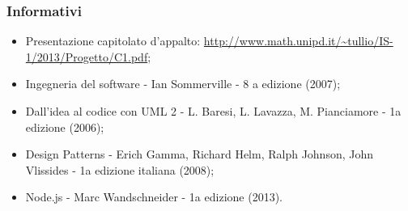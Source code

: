 		\subsubsection{Informativi}

		\begin{itemize}
		\item Presentazione capitolato d'appalto: \url{http://www.math.unipd.it/~tullio/IS-1/2013/Progetto/C1.pdf};
		\item Ingegneria del software - Ian Sommerville - 8 a edizione (2007);
		\item Dall’idea al codice con UML 2 - L. Baresi, L. Lavazza, M. Pianciamore - 1a edizione
(2006);
		\item Design Patterns - Erich Gamma, Richard Helm, Ralph Johnson, John Vlissides - 1a edizione italiana (2008);
		\item Node.js - Marc Wandschneider - 1a edizione (2013).
		
		\end{itemize}
		
	\pagebreak
